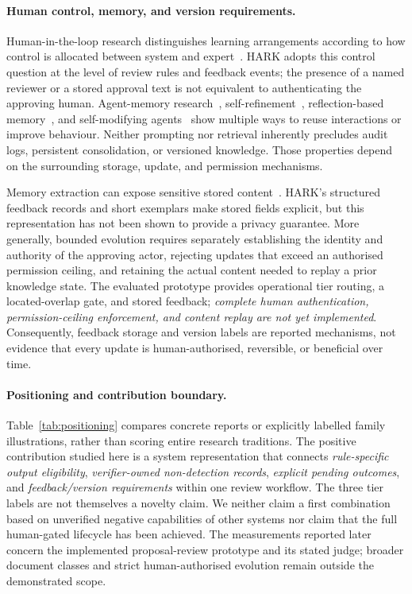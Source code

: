 \documentclass[computers,article,submit,moreauthors]{Definitions/mdpi}
\begin{document}
\paragraph{Human control, memory, and version requirements.}
Human-in-the-loop research distinguishes learning arrangements according to how control is allocated between system and expert~\cite{mosqueira2023}. HARK adopts this control question at the level of review rules and feedback events; the presence of a named reviewer or a stored approval text is not equivalent to authenticating the approving human. Agent-memory research~\cite{wang2024agents}, self-refinement~\cite{madaan2023}, reflection-based memory~\cite{shinn2023}, and self-modifying agents~\cite{zhang2025dgm} show multiple ways to reuse interactions or improve behaviour. Neither prompting nor retrieval inherently precludes audit logs, persistent consolidation, or versioned knowledge. Those properties depend on the surrounding storage, update, and permission mechanisms.

Memory extraction can expose sensitive stored content~\cite{mempriv2025}. HARK's structured feedback records and short exemplars make stored fields explicit, but this representation has not been shown to provide a privacy guarantee. More generally, bounded evolution requires separately establishing the identity and authority of the approving actor, rejecting updates that exceed an authorised permission ceiling, and retaining the actual content needed to replay a prior knowledge state. The evaluated prototype provides operational tier routing, a located-overlap gate, and stored feedback; \emph{complete human authentication, permission-ceiling enforcement, and content replay are not yet implemented}. Consequently, feedback storage and version labels are reported mechanisms, not evidence that every update is human-authorised, reversible, or beneficial over time.

\paragraph{Positioning and contribution boundary.}
Table~\ref{tab:positioning} compares concrete reports or explicitly labelled family illustrations, rather than scoring entire research traditions. The positive contribution studied here is a system representation that connects \emph{rule-specific output eligibility}, \emph{verifier-owned non-detection records}, \emph{explicit pending outcomes}, and \emph{feedback/version requirements} within one review workflow. The three tier labels are not themselves a novelty claim. We neither claim a first combination based on unverified negative capabilities of other systems nor claim that the full human-gated lifecycle has been achieved. The measurements reported later concern the implemented proposal-review prototype and its stated judge; broader document classes and strict human-authorised evolution remain outside the demonstrated scope.
\end{document}
